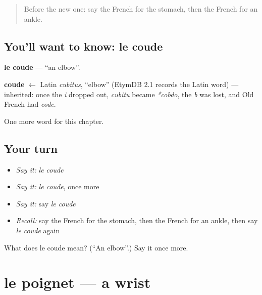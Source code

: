 \label{lesson:FR-C52-coude}



\begin{quote}
Before the new one: say the French for the stomach, then the French for an ankle.
\end{quote}

\subsection*{You'll want to know: le coude}
\textbf{le coude} — \textquotedblleft{}an elbow\textquotedblright{}.

\begin{cousinweb}
\textbf{coude} $\leftarrow$ Latin \emph{cubitus}, \textquotedblleft{}elbow\textquotedblright{} (EtymDB 2.1 records the Latin word) — inherited: once the \emph{i} dropped out, \emph{cubitu} became \emph{*cobdo}, the \emph{b} was lost, and Old French had \emph{code}.
\end{cousinweb}

\begin{grammarlens}[title={What you've built}]
One more word for this chapter.
\end{grammarlens}

\subsection*{Your turn}
\begin{itemize}
\raggedright
  \item \emph{Say it:} \emph{le coude}
  \item \emph{Say it:} \emph{le coude}, once more
  \item \emph{Say it:} say \emph{le coude}
  \item \emph{Recall:} say the French for the stomach, then the French for an ankle, then say \emph{le coude} again
\end{itemize}

\begin{tcolorbox}[breakable,colback=teal!4,colframe=teal!35!black,title={Before you move on}]
What does le coude mean? (\textquotedblleft{}An elbow\textquotedblright{}.) Say it once more.
\end{tcolorbox}
\section[le poignet]{le poignet — a wrist}

\label{lesson:FR-C52-poignet}



